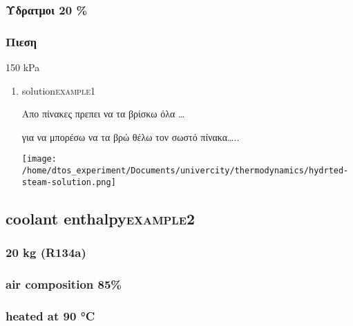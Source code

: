 \documentclass[11pt]{article}
\begin{document}
\subsubsection{Υδρατμοι 20 \%}
\label{sec:orgb981b4c}
\subsubsection{Πιεση}
\label{sec:orgbc43471}
150 kPa
\begin{enumerate}
\item solution\hfill{}\textsc{example1}
\label{sec:org36facdb}

Απο πίνακες πρεπει να τα βρίσκω όλα \ldots{}

για να μπορέσω να τα βρώ θέλω τον σωστό πίνακα\ldots{}..

\begin{center}
\texttt{[image: /home/dtos\_experiment/Documents/univercity/thermodynamics/hydrted-steam-solution.png]}
\end{center}
\end{enumerate}
\subsection{coolant enthalpy\hfill{}\textsc{example2}}
\label{sec:orgfd071ef}
\subsubsection{20 kg (R134a)}
\label{sec:org82575cc}
\subsubsection{air composition 85\%}
\label{sec:orgb5079e9}
\subsubsection{heated at 90 °C}
\label{sec:org0c70943}
\end{document}
